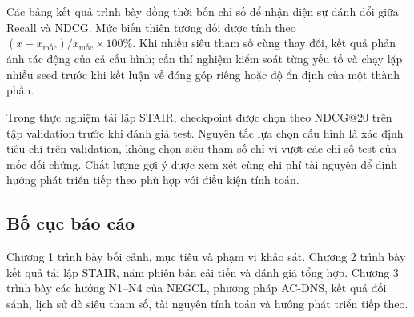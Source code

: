 Các bảng kết quả trình bày đồng thời bốn chỉ số để nhận diện sự đánh đổi giữa Recall và NDCG. Mức biến thiên tương đối được tính theo $(x-x_{\text{mốc}})/x_{\text{mốc}}\times100\%$. Khi nhiều siêu tham số cùng thay đổi, kết quả phản ánh tác động của cả cấu hình; cần thí nghiệm kiểm soát từng yếu tố và chạy lặp nhiều seed trước khi kết luận về đóng góp riêng hoặc độ ổn định của một thành phần.

Trong thực nghiệm tái lập STAIR, checkpoint được chọn theo NDCG@20 trên tập validation trước khi đánh giá test. Nguyên tắc lựa chọn cấu hình là xác định tiêu chí trên validation, không chọn siêu tham số chỉ vì vượt các chỉ số test của mốc đối chứng. Chất lượng gợi ý được xem xét cùng chi phí tài nguyên để định hướng phát triển tiếp theo phù hợp với điều kiện tính toán.

\subsection{Bố cục báo cáo}

Chương 1 trình bày bối cảnh, mục tiêu và phạm vi khảo sát. Chương 2 trình bày kết quả tái lập STAIR, năm phiên bản cải tiến và đánh giá tổng hợp. Chương 3 trình bày các hướng N1--N4 của NEGCL, phương pháp AC-DNS, kết quả đối sánh, lịch sử dò siêu tham số, tài nguyên tính toán và hướng phát triển tiếp theo.

\clearpage